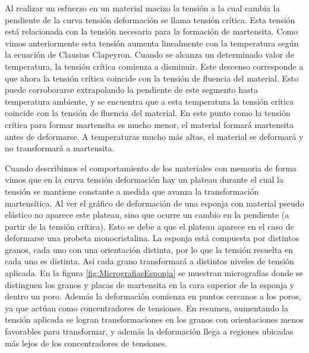 \documentclass[a4paper,12pt,fleqn,twoside,openany]{book}
\begin{document}
Al realizar un esfuerzo en un material macizo la tensión a la cual cambia la pendiente de la curva tensión deformación se llama tensión crítica. Esta 
tensión está relacionada con la tensión necesaria para la formación de martensita. Como vimos anteriormente esta tensión aumenta linealmente con la temperatura según la 
ecuación de Clausius Clapeyron. Cuando se alcanza un determinado valor de temperatura, la tensión crítica comienza a disminuir. Este descenso corresponde a que ahora la tensión crítica 
coincide con la tensión de fluencia del material. Esto puede corroborarse extrapolando la pendiente de este segmento hasta temperatura ambiente, y se encuentra que a esta 
temperatura la tensión crítica coincide con la tensión de fluencia del material. En este punto como la tensión crítica para formar martensita es mucho menor, el 
material formará martensita antes de deformarse. A temperaturas mucho más altas, el material se deformará y no transformará a martensita.



Cuando describimos el comportamiento de los materiales con memoria de forma vimos que en la curva tensión deformación hay un plateau durante el cual la tensión se 
mantiene constante a medida que avanza la transformación martensítica. Al ver el gráfico de deformación de una esponja con material pseudo elástico no aparece este plateau, 
sino que ocurre un cambio en la pendiente (a partir de la tensión crítica). Esto se debe a que el plateau aparece en el caso de deformarse una probeta monocristalina. 
La esponja está compuesta por distintos granos, cada uno con una orientación distinta, por lo que la tensión resuelta en cada uno es distinta. Así cada grano transformará 
a distintos niveles de tensión aplicada. En la figura \ref{fig:MicrografiasEsponja} se muestran micrografías donde se distinguen los granos y placas de martensita en la cara superior de la esponja y dentro un poro. Además la deformación comienza en puntos cercanos a los poros, ya que actúan como concentradores de tensiones. En resumen, 
aumentando la tensión aplicada se logran transformaciones en los granos con orientaciones menos favorables para transformar, y además la deformación llega a regiones ubicadas más lejos 
de los concentradores de tensiones.
\end{document}
